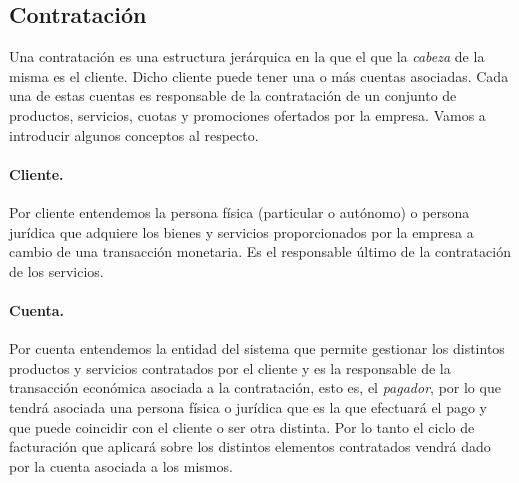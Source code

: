 \subsection{Contratación}

Una contratación es una estructura jerárquica en la que el que la \textit{cabeza} de la misma es el cliente. Dicho cliente puede tener una o más cuentas asociadas. Cada una de estas cuentas es responsable de la contratación de un conjunto de productos, servicios, cuotas y promociones ofertados por la empresa. Vamos a introducir algunos conceptos al respecto. 

\paragraph{Cliente.} Por cliente entendemos la persona física (particular o autónomo) o persona jurídica que adquiere los bienes y servicios proporcionados por la empresa a cambio de una transacción monetaria. Es el responsable último de la contratación de los servicios.

\paragraph{Cuenta.} Por cuenta entendemos la entidad del sistema que permite gestionar los distintos productos y servicios contratados por el cliente y es la responsable de la transacción económica asociada a la contratación, esto es, el \textit{pagador}, por lo que tendrá asociada una persona física o jurídica que es la que efectuará el pago y que puede coincidir con el cliente o ser otra distinta. Por lo tanto el ciclo de facturación que aplicará sobre los distintos elementos contratados vendrá dado por la cuenta asociada a los mismos.

